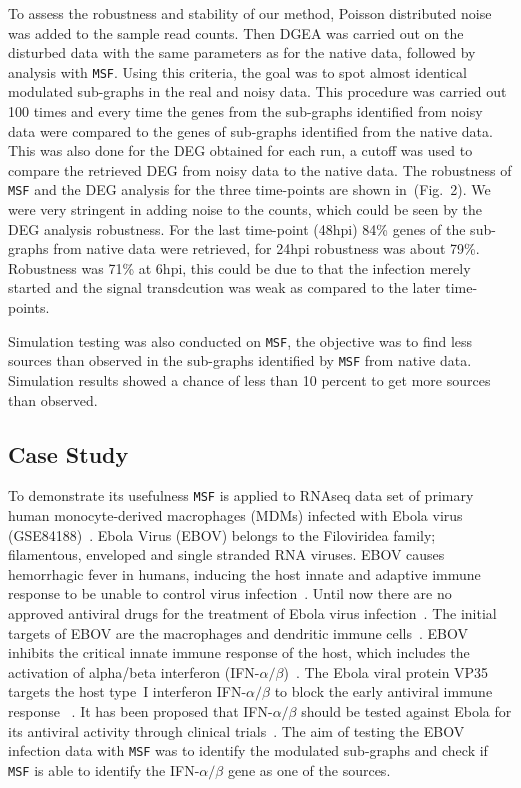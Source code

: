 \documentclass[twocolumn]{article}
\begin{document}
To assess the robustness and stability of our method, Poisson distributed noise was added to the sample read counts. Then DGEA was carried out on the disturbed data with the same parameters as for the native data, followed by analysis with \texttt{MSF}. Using this criteria, the goal was to spot almost
identical modulated sub-graphs in the real and noisy data. This procedure was carried out 100 times and every time the genes from the sub-graphs identified from noisy data were compared to the genes of sub-graphs identified from the native data. This was also done for the DEG obtained for each run, a cutoff was used to compare the retrieved DEG from noisy data to the native data.  The robustness of \texttt{MSF} and the DEG analysis for the three time-points are shown in~(Fig.~2). We were very stringent in adding noise to the counts, which could be seen by the DEG analysis robustness. For the last time-point (48hpi) 84\% genes of the sub-graphs from native data were retrieved, for 24hpi robustness was about 79\%. Robustness was 71\% at 6hpi, this could be due to that the infection merely started and the signal transdcution was weak as compared to the later time-points.

Simulation testing was also conducted on \texttt{MSF}, the objective was to find less sources than observed in the sub-graphs identified by \texttt{MSF} from native data. Simulation results showed a chance of less than 10 percent to get more sources than observed.

\subsection*{Case Study}

To demonstrate its usefulness \texttt{MSF} is applied to RNAseq data
set of primary human monocyte-derived macrophages (MDMs) infected with
Ebola virus (GSE84188)~\cite{Olejnik}. Ebola Virus (EBOV)
belongs to the Filoviridea family; filamentous, enveloped and single
stranded RNA viruses. EBOV causes hemorrhagic fever in humans,
inducing the host innate and adaptive immune response to be unable to
control virus infection~\cite{Prins}. Until now there are no approved
antiviral drugs for the treatment of Ebola virus infection~\cite{Konde,Rhein}.
The initial targets of EBOV are the macrophages and
dendritic immune cells~\cite{Falasca,Rhein}. EBOV inhibits the critical
innate immune response of the host, which includes the activation of
alpha/beta interferon (IFN-$\alpha /
\beta$)~\cite{Prins,Konde,Cardenas}. The Ebola viral protein VP35
targets the host type~I interferon IFN-$\alpha / \beta$ to block the
early antiviral immune response
~\cite{Prins,Konde,Falasca,Cardenas,Olejnik}. It has been proposed
that IFN-$\alpha / \beta$  should be
tested against Ebola for its antiviral activity through clinical trials~\cite{Konde}. The aim of testing the EBOV infection data with \texttt{MSF} was to identify the modulated sub-graphs and check if \texttt{MSF} is able to identify the IFN-$\alpha / \beta$ gene as one of the sources.
\end{document}
